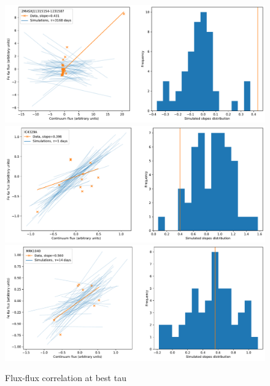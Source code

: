 \begin{figure}
\begin{center}
    {
  \includegraphics[width=\textwidth]{Figs/Chapter5/Flux_corr/Flux_flux_2MASXJ11315154-1231587_besttau.pdf} \\
  \includegraphics[width=\textwidth]{Figs/Chapter5/Flux_corr/Flux_flux_IC4329A_besttau.pdf} \\
  \includegraphics[width=\textwidth]{Figs/Chapter5/Flux_corr/Flux_flux_MRK1040_besttau.pdf}  \\
  \caption{Flux-flux correlation at best tau}
    \label{fig:Flux-flux_all_1}
  }
\end{center}
\end{figure}

